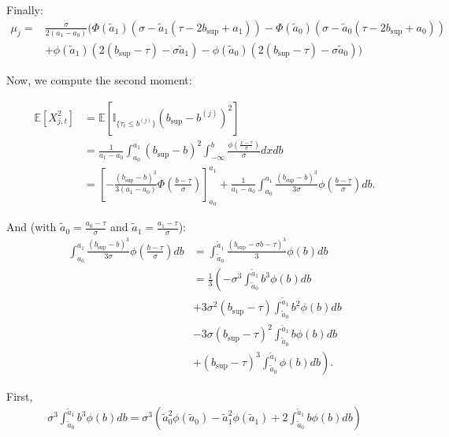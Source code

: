\documentclass[11pt]{article}
\begin{document}
Finally:
\begin{align*}
  \mu_j = &\frac{\sigma}{2(a_1 - a_0)}\biggl( \Phi\left(\tilde{a}_1\right) \left( \sigma - \tilde{a}_1\left(\tau - 2 b_{\sup} + a_1 \right)\right) - \Phi\left(\tilde{a}_0\right) \left( \sigma - \tilde{a}_0 \left(\tau - 2 b_{\sup} + a_0 \right)\right)\\
        &+ \phi\left(\tilde{a}_1\right)\left(  2 ( b_{\sup} - \tau)-\sigma \tilde{a}_1\right) - \phi\left(\tilde{a}_0\right)\left(  2 ( b_{\sup} - \tau)- \sigma \tilde{a}_0\right)\biggr)
\end{align*}

\bigskip

Now, we compute the second moment:

\begin{align*}
  \mathbb{E}[X_{j,t}^2] &= \mathbb{E}[\mathbb{I}_{\{\tau_t \leq b^{(j)}\}}(b_{\sup}-b^{(j)})^2] \\
  & = \frac{1}{a_1 - a_0}\int_{a_0}^{a_1} (b_{\sup}-b)^2 \int_{-\infty}^{b} \frac{\phi\left(\frac{x - \tau}{\sigma}\right)}{\sigma} dx db \\
  & = \left[- \frac{(b_{\sup}-b)^3}{3 (a_1 - a_0)} \Phi\left(\frac{b - \tau}{\sigma}\right) \right]_{a_0}^{a_1} + \frac{1}{a_1 - a_0}\int_{a_0}^{a_1}  \frac{(b_{\sup}-b)^3}{3 \sigma} \phi\left(\frac{b - \tau}{\sigma}\right)db.
\end{align*}

And (with $\tilde{a}_0 = \frac{a_{0} - \tau}{\sigma} $ and $\tilde{a}_1 = \frac{a_{1} - \tau}{\sigma}$):
\begin{align*}
  \int_{a_0}^{a_1}  \frac{(b_{\sup}-b)^3}{3 \sigma} \phi\left(\frac{b - \tau}{\sigma}\right)db & = \int_{\tilde{a}_0}^{\tilde{a}_1}  \frac{(b_{\sup}- \sigma b - \tau)^3}{3} \phi\left(b\right)db \\
  & = \frac{1}{3}\left(- \sigma^3\int_{\tilde{a}_0}^{\tilde{a}_1} b^3 \phi\left(b\right)db\right. \\
  & + 3 \sigma^2 (b_{\sup}- \tau)\int_{\tilde{a}_0}^{\tilde{a}_1} b^2 \phi\left(b\right)db \\
  & - 3 \sigma (b_{\sup}- \tau)^2\int_{\tilde{a}_0}^{\tilde{a}_1} b \phi\left(b\right)db \\
  & + \left.(b_{\sup}- \tau)^3 \int_{\tilde{a}_0}^{\tilde{a}_1} \phi\left(b\right)db \right).
\end{align*}

First,
\begin{align*}
  \sigma^3\int_{\tilde{a}_0}^{\tilde{a}_1} b^3 \phi\left(b\right)db = \sigma^3 \left( \tilde{a}_0^2 \phi(\tilde{a}_0) -\tilde{a}_1^2 \phi(\tilde{a}_1) + 2 \int_{\tilde{a}_0}^{\tilde{a}_1} b \phi(b) db\right)
\end{align*}
\end{document}
